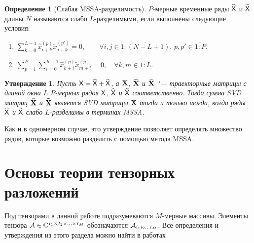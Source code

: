 \documentclass[specialist,
    substylefile = spbu.rtx,
    subf,href,colorlinks=true, 12pt]{disser}
\theoremstyle{plain}
\newtheorem{statement}{Утверждение}[section]
\theoremstyle{definition}
\newtheorem{definition}{Определение}[section]
\theoremstyle{remark}
\begin{document}
    \begin{definition}[Слабая MSSA-разделимость]
        \label{def:mssa-separability}
        $P$-мерные временные ряды $\widehat{\mathsf{X}}$ и $\widetilde{\mathsf{X}}$ длины $N$ называются слабо $L$-разделимыми, если
        выполнены следующие условия:
        \begin{enumerate}
            \item $\displaystyle \sum_{k=0}^{L-1} \hat{x}_{i+k}^{(p)}\tilde{x}_{j+k}^{(p')} = 0, 
            \qquad \forall i, j \in \overline{1:(N-L+1)},\, p, p' \in \overline{1:P}$,
            \item $\displaystyle \sum_{p=1}^{P} \sum_{i=0}^{K-1} \hat{x}_{k+i}^{(p)} \tilde{x}_{m+i}^{(p)} = 0, \quad
            \forall k, m \in \overline{1:L}$.
        \end{enumerate}
    \end{definition}
    
    \begin{statement}
        \label{state:mssa-separability}
        Пусть $\mathsf{X} = \widehat{\mathsf{X}} + \widetilde{\mathsf{X}}$, а $\mathbf{X}$, $\widehat{\mathbf{X}}$ и $\widetilde{\mathbf{X}}$ "--- траекторные
        матрицы с длиной окна $L$ $P$-мерных рядов $\mathsf{X}$, $\widehat{\mathsf{X}}$ и $\widetilde{\mathsf{X}}$ соответственно.
        Тогда сумма \emph{SVD} матриц $\widehat{\mathbf{X}}$ и $\widetilde{\mathbf{X}}$ является \emph{SVD} матрицы $\mathbf{X}$ тогда и только тогда, когда
        ряды $\widehat{\mathsf{X}}$ и $\widetilde{\mathsf{X}}$ слабо $L$-разделимы в терминах MSSA.
    \end{statement}
    Как и в одномерном случае, это утверждение позволяет определять множество рядов, которые возможно разделить с 
    помощью метода MSSA.
    

    \section{Основы теории тензорных разложений}\label{sec:tensor-decompositions}
    Под тензорами в данной работе подразумеваются $M$-мерные массивы.
    Элементы тензора $\mathcal{A} \in \mathbb{C}^{I_1 \times I_2 \times \ldots \times I_M}$ обозначаются
    $\mathcal{A}_{i_1 i_2 \ldots i_M}$.
    Все определения и утверждения из этого раздела можно найти в работах~\cite{hosvd, tensors-bg}
    
    
\end{document}
